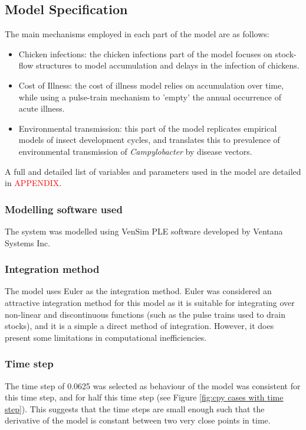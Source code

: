 \subsection{Model Specification}
The main mechanisms employed in each part of the model are as follows:
\begin{itemize}
    \item Chicken infections: the chicken infections part of the model focuses on stock-flow structures to model accumulation and delays in the infection of chickens.
    \item Cost of Illness: the cost of illness model relies on accumulation over time, while using a pulse-train mechanism to 'empty' the annual occurrence of acute illness.
    \item Environmental transmission: this part of the model replicates empirical models of insect development cycles, and translates this to prevalence of environmental transmission of \textit{Campylobacter} by disease vectors.
\end{itemize} %

A full and detailed list of variables and parameters used in the model are detailed in \textcolor{red}{APPENDIX}.
\subsubsection{Modelling software used}
The system was modelled using VenSim PLE software developed by Ventana Systems Inc.
    
\subsubsection{Integration method}
The model uses Euler as the integration method. Euler was considered an attractive integration method for this model as it is suitable for integrating over non-linear and discontinuous functions (such as the pulse trains used to drain stocks), and it is a simple a direct method of integration. However, it does present some limitations in computational inefficiencies.

\subsubsection{Time step}
The time step of 0.0625 was selected as behaviour of the model was consistent for this time step, and for half this time step (see Figure \ref{fig:cpy cases with time step}). This suggests that the time steps are small enough such that the derivative of the model is constant between two very close points in time.

